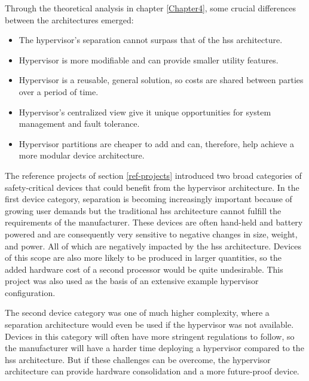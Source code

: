Through the theoretical analysis in chapter \ref{Chapter4}, some crucial differences between the architectures emerged:
\begin{itemize}
    \item The hypervisor's separation cannot surpass that of the \acrshort{hss} architecture.
    \item Hypervisor is more modifiable and can provide smaller utility features.
    \item Hypervisor is a reusable, general solution, so costs are shared between parties over a period of time.
    \item Hypervisor's centralized view give it unique opportunities for system management and fault tolerance.
    \item Hypervisor partitions are cheaper to add and can, therefore, help achieve a more modular device architecture.
\end{itemize}

The reference projects of section \ref{ref-projects} introduced two broad categories of safety-critical devices that could benefit from the hypervisor architecture. In the first device category, separation is becoming increasingly important because of growing user demands but the traditional \acrshort{hss} architecture cannot fulfill the requirements of the manufacturer. These devices are often hand-held and battery powered and are consequently very sensitive to negative changes in size, weight, and power. All of which are negatively impacted by the \acrshort{hss} architecture.
Devices of this scope are also more likely to be produced in larger quantities, so the added hardware cost of a second processor would be quite undesirable. This project was also used as the basis of an extensive example hypervisor configuration.

The second device category was one of much higher complexity, where a separation architecture would even be used if the hypervisor was not available. Devices in this category will often have more stringent regulations to follow, so the manufacturer will have a harder time deploying a hypervisor compared to the \acrshort{hss} architecture. But if these challenges can be overcome, the hypervisor architecture can provide hardware consolidation and a more future-proof device.

